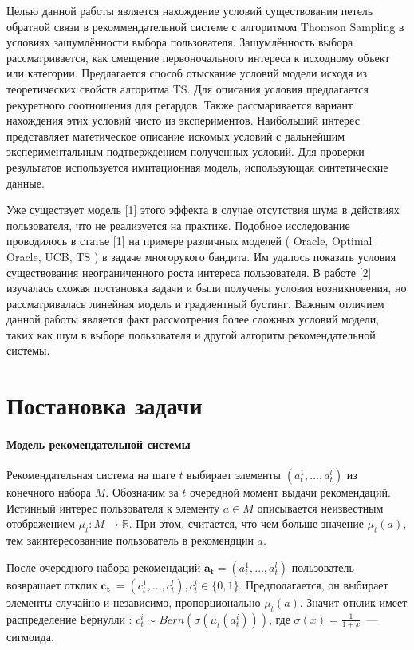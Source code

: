 \documentclass[12pt, twoside]{article}
\begin{document}
Целью данной работы является нахождение условий существования петель обратной связи в рекоммендательной системе с алгоритмом Thomson Sampling в условиях зашумлённости выбора пользователя.
Зашумлённость выбора рассматривается, как смещение первоночального интереса к исходному объект или категории.
Предлагается способ отыскание условий модели исходя из теоретических свойств алгоритма TS. 
Для описания условия предлагается рекуретного соотношения для регардов.  
Также рассмаривается вариант нахождения этих условий чисто из экспериментов. 
Наибольший интерес представляет матетическое описание искомых условий с дальнейшим экспериментальным подтверждением полученных условий.
Для проверки результатов используется имитационная модель, использующая синтетические данные.  

Уже существует модель [1] этого эффекта в случае отсутствия шума в действиях пользователя, что не реализуется на практике. 
Подобное исследование проводилось в статье [1] на примере различных моделей ( Oracle, Optimal Oracle, UCB,  TS ) в задаче многорукого бандита. 
Им удалось показать условия существования неограниченного роста интереса пользователя. 
В работе [2] изучалась схожая постановка задачи и были получены условия возникновения, но рассматривалась линейная модель и градиентный бустинг. 
Важным отличием данной работы является факт рассмотрения более сложных условий модели, таких как шум в выборе пользователя и другой алгоритм рекомендательной системы.  

\section{Постановка задачи}
\paragraph{Модель рекомендательной системы}
Рекомендательная система на шаге $t$ выбирает элементы $(a^1_t, \dots, a^l_t)$ из конечного набора $M$. 
Обозначим за $t$ очередной момент выдачи рекомендаций.
Истинный $\textit{интерес}$ пользователя к элементу $a \in M$ описывается неизвестным отображением $\mu_t : M \to \mathbb{R}$. 
При этом,  считается, что чем больше значение $\mu_t (a)$, тем заинтересованние пользователь в рекомендции $a$.

После очередного набора рекомендаций $\mathbf{a_t} = (a_t^1, \dots, a_t^l)$ пользователь возвращает $\textit{отклик}$ $\mathbf{c_t}~= (c_t^1, \dots, c_t^l), c_t^i \in \{0, 1\}$. 
Предполагается, он выбирает элементы случайно и независимо, пропорционально $\mu_t(a)$.
Значит отклик имеет распределение Бернулли : $c_t^i \sim Bern (\sigma(\mu_t(a_t^i)))$, где $\sigma(x) = \frac{1}{1+x}$~--- сигмоида. 
\end{document}
